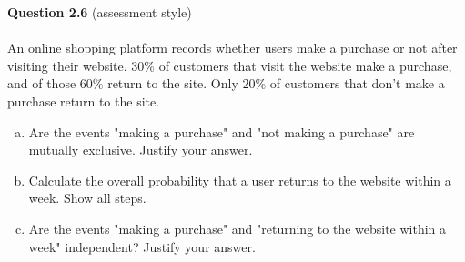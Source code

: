 \documentclass{article}
\begin{document}
%
%
{\bf Question 2.6} (assessment style)
~\\~\\
An online shopping platform records whether users make a purchase or not after visiting their website. $30\%$ of customers that visit the website make a purchase, and of those $60\%$ return to the site. Only $20\%$ of customers that don't make a purchase return to the site. 
\begin{enumerate}[(a)]
\item Are the events "making a purchase" and "not making a purchase" are mutually exclusive. Justify your answer.
\item Calculate the overall probability that a user returns to the website within a week. Show all steps.
\item Are the events "making a purchase" and "returning to the website within a week" independent? Justify your answer.
\end{enumerate}
\end{document}
